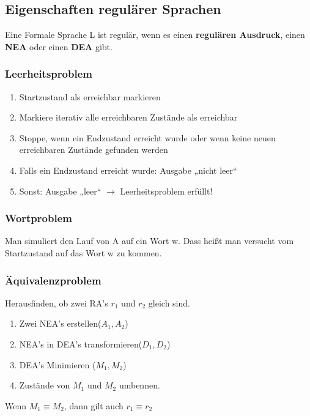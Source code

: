 \documentclass[12pt,a4paper]{article}
\begin{document}
	\subsection{Eigenschaften regulärer Sprachen}
	Eine Formale Sprache L ist regulär, wenn es einen \textbf{regulären Ausdruck}, einen \textbf{NEA} oder einen \textbf{DEA} gibt.

	\subsubsection{Leerheitsproblem}
	\begin{enumerate}
	\item Startzustand als erreichbar markieren
	\item Markiere iterativ alle erreichbaren Zustände als erreichbar
	\item Stoppe, wenn ein Endzustand erreicht wurde oder wenn keine neuen erreichbaren Zustände gefunden werden
	\item Falls ein Endzustand erreicht wurde: Ausgabe „nicht leer“
	\item Sonst: Ausgabe „leer“ $\rightarrow$ Leerheitsproblem erfüllt!
	\end{enumerate}

	\subsubsection{Wortproblem}
	Man simuliert den Lauf von A auf ein Wort w. Dass heißt man versucht vom Startzustand auf das Wort w zu kommen.

	\subsubsection{Äquivalenzproblem}
	Herausfinden, ob zwei RA's $r_1$ und $r_2$ gleich sind.

	\begin{enumerate}
	\item Zwei NEA's erstellen($A_1, A_2$)
	\item NEA's in DEA's transformieren($D_1, D_2$)
	\item DEA's Minimieren ($M_1, M_2$)
	\item Zustände von $M_1$ und $M_2$ umbennen.
	\end{enumerate}
	\vspace{.5cm}
	Wenn $M_1 \equiv M_2$, dann gilt auch $r_1 \equiv r_2$
\end{document}

